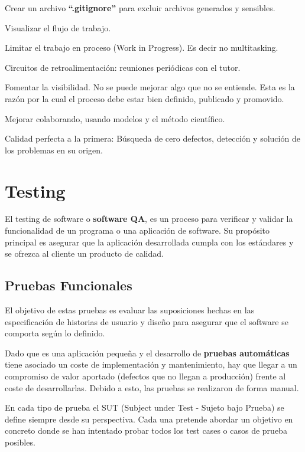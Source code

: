 \documentclass[12pt,twoside,titlepage]{report}
\begin{document}
\begin{compactitem}
    \item Crear un archivo \textbf{``.gitignore''} para excluir archivos generados y sensibles.
    \item Visualizar el flujo de trabajo.
    \item Limitar el trabajo en proceso (Work in Progress). Es decir no multitasking.
    \item Circuitos de retroalimentación: reuniones periódicas con el tutor.
    \item Fomentar la visibilidad. No se puede mejorar algo que no se entiende. Esta es la razón por la cual el proceso debe estar bien definido, publicado y promovido.
    \item Mejorar colaborando, usando modelos y el método científico.
    \item Calidad perfecta a la primera: Búsqueda de cero defectos, detección y solución de los problemas en su origen.
\end{compactitem}

\section{Testing}

El testing de software o \textbf{software QA}, es un proceso para verificar y validar la funcionalidad de un programa o una aplicación de software. Su propósito principal es asegurar que la aplicación desarrollada cumpla con los estándares y se ofrezca al cliente un producto de calidad.

\subsection{Pruebas Funcionales}

El objetivo de estas pruebas es evaluar las suposiciones hechas en las especificación de historias de usuario y diseño para asegurar que el software se comporta según lo definido.

Dado que es una aplicación pequeña y el desarrollo de \textbf{pruebas automáticas} tiene asociado un coste de implementación y mantenimiento, hay que llegar a un compromiso de valor aportado (defectos que no llegan a producción) frente al coste de desarrollarlas. Debido a esto, las pruebas se realizaron de forma manual. 

En cada tipo de prueba el SUT (Subject under Test - Sujeto bajo Prueba) se define siempre desde su perspectiva. Cada una pretende abordar un objetivo en concreto donde se han intentado probar todos los test cases o casos de prueba posibles.
\end{document}
